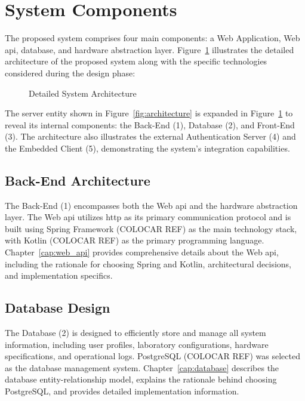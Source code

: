 \section{System Components}\label{sec:system_components}
The proposed system comprises four main components: a Web Application, Web \acs{api}, database, and hardware abstraction layer. Figure~\ref{fig:detailed_architecture} illustrates the detailed architecture of the proposed system along with the specific technologies considered during the design phase:

\begin{figure}[H]
    \centering
    
\caption{Detailed System Architecture}
\label{fig:detailed_architecture}
\end{figure}

The server entity shown in Figure~\ref{fig:architecture} is expanded in Figure~\ref{fig:detailed_architecture} to reveal its internal components: the Back-End (1), Database (2), and Front-End (3). The architecture also illustrates the external Authentication Server (4) and the Embedded Client (5), demonstrating the system's integration capabilities.

\subsection*{Back-End Architecture}
The Back-End (1) encompasses both the Web \acs{api} and the hardware abstraction layer. The Web \acs{api} utilizes \acf{http} as its primary communication protocol and is built using Spring Framework (COLOCAR REF) as the main technology stack, with Kotlin (COLOCAR REF) as the primary programming language. Chapter~\ref{cap:web_api} provides comprehensive details about the Web \acs{api}, including the rationale for choosing Spring and Kotlin, architectural decisions, and implementation specifics.

\subsection*{Database Design}
The Database (2) is designed to efficiently store and manage all system information, including user profiles, laboratory configurations, hardware specifications, and operational logs. PostgreSQL (COLOCAR REF) was selected as the database management system. Chapter~\ref{cap:database} describes the database entity-relationship model, explains the rationale behind choosing PostgreSQL, and provides detailed implementation information.

